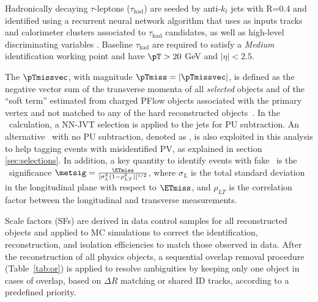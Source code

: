Hadronically decaying $\tau$-leptons ($\tau_\mathrm{had}$) are seeded by anti-$k_t$ jets with R=0.4 and identified using a recurrent neural network algorithm that uses
as inputs tracks and calorimeter clusters associated to $\tau_\mathrm{had}$ candidates, as well as high-level discriminating
variables \cite{ATL-PHYS-PUB-2019-033}. Baseline $\tau_\mathrm{had}$ are required to satisfy a \textit{Medium} identification working point and have $\pT>20$ GeV and $|\eta| < 2.5$.  

The $\pTmissvec$, with magnitude $\pTmiss=|\pTmissvec|$, is defined as the negative vector sum of the transverse momenta of all \textit{selected} objects and of the “soft term” estimated from charged PFlow objects associated with the primary vertex and not matched to any of the hard reconstructed objects~\cite{METPERF_2025,JETM-2020-03,Balunas:2023fpu}. In the \pTmissvec\ calculation, a NN-JVT selection is applied to the jets for PU subtraction. An alternative \pTmissvec\ with no PU subtraction, denoted as \pTmissvecNoJVT, is also exploited in this analysis to help tagging events with misidentified PV, as explained in section \ref{sec:selections}. In addition, a key quantity to identify events with fake \ETmiss\ is the \ETmiss\ significance $\metsig=\frac{\ETmiss}{[\sigma^2_{L}(1-\rho_{LT}^2)]^{1/2}}$, where $\sigma_L$ is the  total standard deviation in the longitudinal plane with respect to $\ETmiss$, and $\rho_{LT}$ is the correlation factor between the longitudinal and transverse measurements. 

Scale factors (SFs) are derived in data control samples for all reconstructed objects and applied to MC simulations to correct the identification, reconstruction, and isolation efficiencies to match those observed in data. After the reconstruction of all physics objects, a sequential overlap removal procedure (Table~\ref{tab:or}) is applied to resolve ambiguities by keeping only one object in cases of overlap, based on $\Delta R$ matching or shared ID tracks, according to a predefined priority.


